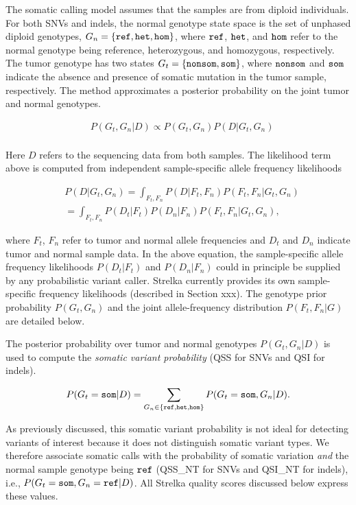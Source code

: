 \documentclass{article}
\begin{document}
The somatic calling model assumes that the samples are from diploid individuals. For both SNVs and indels, the normal genotype state space is the set of unphased diploid genotypes, $G_n = \{ \tt{ref}, \tt{het}, \tt{hom}\}$, where $\tt{ref}$, $\tt{het}$, and $\tt{hom}$ refer to the normal genotype being reference, heterozygous, and homozygous, respectively. The tumor genotype has two states $G_t = \{ \tt{nonsom}, \tt{som} \}$, where $\tt{nonsom}$ and $\tt{som}$ indicate the absence and presence of somatic mutation in the tumor sample, respectively. The method approximates a posterior probability on the joint tumor and normal genotypes.

\begin{align*}
	& P(G_t,G_n|D) \propto P(G_t,G_n) P(D|G_t,G_n) \\
\end{align*}


Here $D$ refers to the sequencing data from both samples. The likelihood term above is computed from independent sample-specific allele frequency likelihoods

\begin{align*}
	& P(D|G_t,G_n) = \int_{F_t,F_n}{P(D|F_t,F_n)P(F_t,F_n|G_t,G_n)} \\
	& = \int_{F_t,F_n}{P(D_t|F_t)P(D_n|F_n)P(F_t,F_n|G_t,G_n)},
\end{align*}

\noindent where $F_t$, $F_n$ refer to tumor and normal allele frequencies and $D_t$ and $D_n$ indicate tumor and normal sample data. In the above equation, the sample-specific allele frequency likelihoods $P(D_t|F_t)$ and $P(D_n|F_n)$ could in principle be supplied by any probabilistic variant caller. Strelka currently provides its own sample-specific frequency likelihoods (described in Section xxx). The genotype prior probability $P(G_t, G_n)$ and the joint allele-frequency distribution $P(F_t,F_n|G)$ are detailed below.

The posterior probability over tumor and normal genotypes $P(G_t,G_n|D)$ is used to compute the {\em somatic variant probability} (QSS for SNVs and QSI for indels).

\begin{equation*}
	P(G_t = {\tt som} | D) = \sum_{G_n \in \{ {\tt ref}, {\tt het}, \tt{hom} \}}{P(G_t={\tt som},G_n|D)}.
\end{equation*}

As previously discussed, this somatic variant probability is not ideal for detecting variants of interest because it does not distinguish somatic variant types. We therefore associate somatic calls with the probability of somatic variation {\em and} the normal sample genotype being $\tt ref$ (QSS\_NT for SNVs and QSI\_NT for indels), i.e., $P(G_t = {\tt som}, G_n = {\tt ref} | D)$. All Strelka quality scores discussed below express these values.
\end{document}
